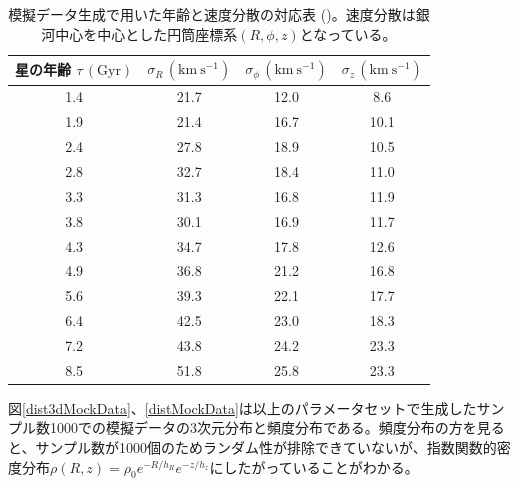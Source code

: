 \begin{table}
\begin{center}
\begin{tabular}{c|c|c|c} \hline
 \rowcolor{LightCyan}
 星の年齢 $\tau\,\mathrm{(Gyr)}$ & $\sigma_R\,\mathrm{(km\ s^{-1})}$ & $\sigma_{\phi}\,\mathrm{(km\ s^{-1})}$ & $\sigma_{z}\,\mathrm{(km\ s^{-1})}$\\
 \hline
 1.4 & 21.7 & 12.0 & 8.6\\
 \hline
 1.9 & 21.4 & 16.7 & 10.1\\
 \hline
 2.4 & 27.8 & 18.9 & 10.5\\
 \hline
 2.8 & 32.7 & 18.4 & 11.0\\
 \hline
 3.3 & 31.3 & 16.8 & 11.9\\
 \hline
 3.8 & 30.1 & 16.9 & 11.7\\
 \hline
 4.3 & 34.7 & 17.8 & 12.6\\
 \hline
 4.9 & 36.8 & 21.2 & 16.8\\
 \hline
 5.6 & 39.3 & 22.1 & 17.7\\
 \hline
 6.4 & 42.5 & 23.0 & 18.3\\
 \hline
 7.2 & 43.8 & 24.2 & 23.3\\
 \hline
 8.5 & 51.8 & 25.8 & 23.3\\
 \hline
\end{tabular} \label{VelocityDispersion}
\vspace{3mm}
\caption{模擬データ生成で用いた年齢と速度分散の対応表 (\cite{YL18})。速度分散は銀河中心を中心とした円筒座標系$(R,\phi,z)$となっている。}
\end{center}
\end{table}

図\ref{dist3dMockData}、\ref{distMockData}は以上のパラメータセットで生成したサンプル数1000での模擬データの3次元分布と頻度分布である。頻度分布の方を見ると、サンプル数が1000個のためランダム性が排除できていないが、指数関数的密度分布$\rho(R,z) = \rho_0 e^{-R/h_R} e^{-z/h_z}$にしたがっていることがわかる。

%


